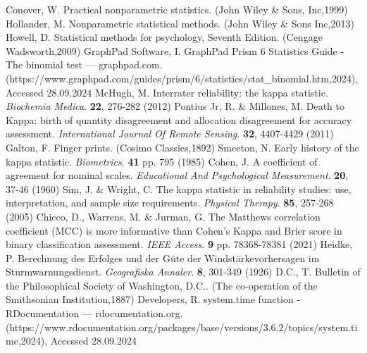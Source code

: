 \documentclass[sn-mathphys-num]{sn-jnl}%
\begin{document}
\begin{thebibliography}{000}
Conover, W. Practical nonparametric statistics. (John Wiley & Sons, Inc,1999)
Hollander, M. Nonparametric statistical methods. (John Wiley & Sons Inc,2013)
Howell, D. Statistical methods for psychology, Seventh Edition. (Cengage Wadsworth,2009)
GraphPad Software, I. GraphPad Prism 6 Statistics Guide - The binomial test — graphpad.com. (https://www.graphpad.com/guides/prism/6/statistics/stat_binomial.htm,2024), Accessed 28.09.2024
McHugh, M. Interrater reliability: the kappa statistic. {\em Biochemia Medica}. \textbf{22}, 276-282 (2012)
Pontius Jr, R. \& Millones, M. Death to Kappa: birth of quantity disagreement and allocation disagreement for accuracy assessment. {\em International Journal Of Remote Sensing}. \textbf{32}, 4407-4429 (2011)
Galton, F. Finger prints. (Cosimo Classics,1892)
Smeeton, N. Early history of the kappa statistic. {\em Biometrics}. \textbf{41} pp. 795 (1985)
Cohen, J. A coefficient of agreement for nominal scales. {\em Educational And Psychological Measurement}. \textbf{20}, 37-46 (1960)
Sim, J. \& Wright, C. The kappa statistic in reliability studies: use, interpretation, and sample size requirements. {\em Physical Therapy}. \textbf{85}, 257-268 (2005)
Chicco, D., Warrens, M. \& Jurman, G. The Matthews correlation coefficient (MCC) is more informative than Cohen's Kappa and Brier score in binary classification assessment. {\em IEEE Access}. \textbf{9} pp. 78368-78381 (2021)
Heidke, P. Berechnung des Erfolges und der Güte der Windstärkevorhersagen im Sturmwarnungsdienst. {\em Geografiska Annaler}. \textbf{8}, 301-349 (1926)
D.C., T. Bulletin of the Philosophical Society of Washington, D.C.. (The co-operation of the Smithsonian Institution,1887)
Developers, R. system.time function - RDocumentation — rdocumentation.org. (https://www.rdocumentation.org/packages/base/versions/3.6.2/topics/system.time,2024), Accessed 28.09.2024

\end{thebibliography}
\end{document}
